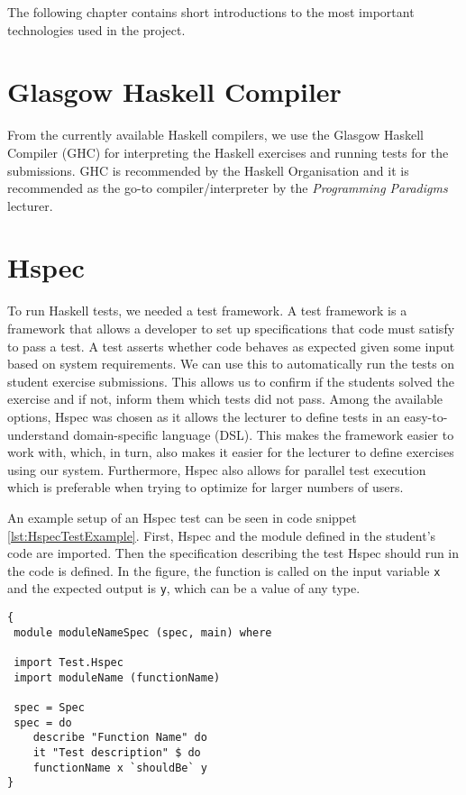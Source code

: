 The following chapter contains short introductions to the most important technologies used in the project.

\section*{Glasgow Haskell Compiler} 
From the currently available Haskell compilers, we use the Glasgow Haskell Compiler (GHC) for interpreting the Haskell exercises and running tests for the submissions. GHC is recommended by the Haskell Organisation and it is recommended as the go-to compiler/interpreter by the \textit{Programming Paradigms} lecturer\cite{Haskell_GHC}.


\section*{Hspec}
To run Haskell tests, we needed a test framework. A test framework is a framework that allows a developer to set up specifications that code must satisfy to pass a test.
A test asserts whether code behaves as expected given some input based on system requirements.
We can use this to automatically run the tests on student exercise submissions.
This allows us to confirm if the students solved the exercise and if not, inform them which tests did not pass.
Among the available options, Hspec was chosen as it allows the lecturer to define tests in an easy-to-understand domain-specific language (DSL).
This makes the framework easier to work with, which, in turn, also makes it easier for the lecturer to define exercises using our system.
Furthermore, Hspec also allows for parallel test execution which is preferable when trying to optimize for larger numbers of users\cite{Hspec_landing}.

An example setup of an Hspec test can be seen in code snippet \ref{lst:HspecTestExample}. First, Hspec and the module defined in the student's code are imported. Then the specification describing the test Hspec should run in the code is defined. In the figure, the function is called on the input variable \texttt{x} and the expected output is \texttt{y}, which can be a value of any type.


\begin{lstlisting}[language=CSharp, caption={An example of a Hspec test}, label={lst:HspecTestExample}]
{
 module moduleNameSpec (spec, main) where

 import Test.Hspec
 import moduleName (functionName)

 spec = Spec
 spec = do
 	describe "Function Name" do
 	it "Test description" $ do
	functionName x `shouldBe` y
}
\end{lstlisting}

